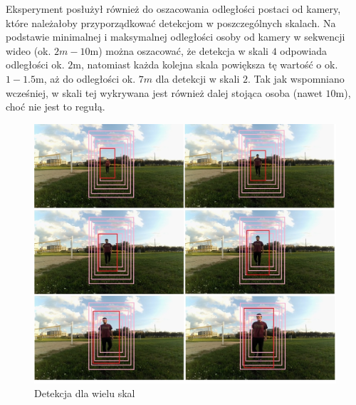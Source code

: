 Eksperyment posłużył również do oszacowania odległości postaci od kamery, które należałoby przyporządkować detekcjom w poszczególnych skalach. 
Na podstawie minimalnej i maksymalnej odległości osoby od kamery w sekwencji wideo (ok. $2m-10$m) można oszacować, że detekcja w skali $4$ odpowiada odległości ok. $2$m, natomiast każda kolejna skala powiększa tę wartość o ok. $1-1.5$m, aż do odległości ok. $7m$ dla detekcji w skali $2$. 
Tak jak wspomniano wcześniej, w skali tej wykrywana jest również dalej stojąca osoba (nawet $10$m), choć nie jest to regułą.
\begin{figure}[h]
	\centering
	\includegraphics[width=15cm]{HOG_scale_all.jpg}
	\caption{Detekcja dla wielu skal}
	\label{fig:SVMmodel_dist}
\end{figure}


